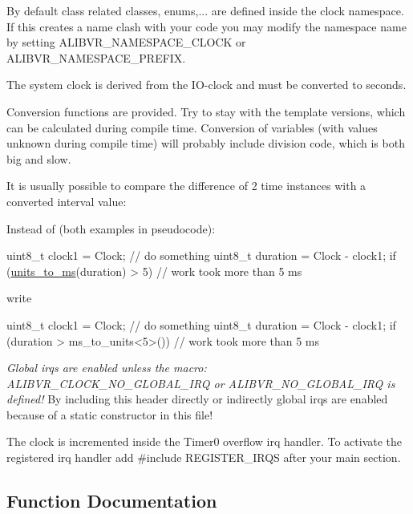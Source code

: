 By default class related classes, enums,... are defined inside the {\ttfamily clock} namespace. If this creates a name clash with your code you may modify the namespace name by setting A\+L\+I\+B\+V\+R\+\_\+\+N\+A\+M\+E\+S\+P\+A\+C\+E\+\_\+\+C\+L\+O\+CK or A\+L\+I\+B\+V\+R\+\_\+\+N\+A\+M\+E\+S\+P\+A\+C\+E\+\_\+\+P\+R\+E\+F\+IX.

The system clock is derived from the I\+O-\/clock and must be converted to seconds.

Conversion functions are provided. Try to stay with the template versions, which can be calculated during compile time. Conversion of variables (with values unknown during compile time) will probably include division code, which is both big and slow.

It is usually possible to compare the difference of 2 time instances with a converted interval value\+:

Instead of (both examples in pseudocode)\+:


\begin{DoxyCode}
uint8\_t clock1 = Clock;
\textcolor{comment}{// do something}
uint8\_t duration = Clock - clock1;
\textcolor{keywordflow}{if} (\hyperlink{namespaceclock_a64b11929624655a5ac990b12829c8606}{units\_to\_ms}(duration) > 5) \textcolor{comment}{// work took more than 5 ms}
\end{DoxyCode}


write


\begin{DoxyCode}
uint8\_t clock1 = Clock;
\textcolor{comment}{// do something}
uint8\_t duration = Clock - clock1;
\textcolor{keywordflow}{if} (duration > ms\_to\_units<5>()) \textcolor{comment}{// work took more than 5 ms}
\end{DoxyCode}


{\itshape Global irqs are enabled unless the macro\+: {\ttfamily A\+L\+I\+B\+V\+R\+\_\+\+C\+L\+O\+C\+K\+\_\+\+N\+O\+\_\+\+G\+L\+O\+B\+A\+L\+\_\+\+I\+RQ} or {\ttfamily A\+L\+I\+B\+V\+R\+\_\+\+N\+O\+\_\+\+G\+L\+O\+B\+A\+L\+\_\+\+I\+RQ} is defined!} By including this header directly or indirectly global irqs are enabled because of a static constructor in this file!

The clock is incremented inside the {\ttfamily Timer0} overflow irq handler. To activate the registered irq handler add {\ttfamily \#include R\+E\+G\+I\+S\+T\+E\+R\+\_\+\+I\+R\+QS} after your {\ttfamily main} section. 

\subsection{Function Documentation}
\hypertarget{namespaceclock_a107ad02a77763be28bf63d43c566cf75}{}\label{namespaceclock_a107ad02a77763be28bf63d43c566cf75} 
